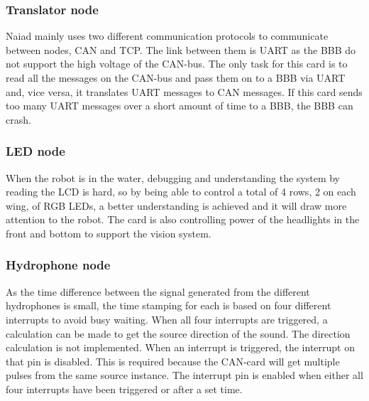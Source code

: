 \subsubsection{Translator node}
\noindent Naiad mainly uses two different communication protocols to communicate between nodes, CAN and TCP. The link between them is UART as the BBB do not support the high voltage of the CAN-bus. The only task for this card is to read all the messages on the CAN-bus and pass them on to a BBB via UART and, vice versa, it translates UART messages to CAN messages. If this card sends too many UART messages over a short amount of time to a BBB, the BBB can crash.  
\subsubsection{LED node}
\noindent When the robot is in the water, debugging and understanding the system by reading the LCD is hard, so by being able to control a total of 4 rows, 2 on each wing, of RGB LEDs, a better understanding is achieved and it will draw more attention to the robot.
The card is also controlling power of the headlights in the front and bottom to support the vision system.
\subsubsection{Hydrophone node}
\noindent As the time difference between the signal generated from the different hydrophones is small, the time stamping for each is based on four different interrupts to avoid busy waiting. When all four interrupts are triggered, a calculation can be made to get the source direction of the sound. The direction calculation is not implemented. When an interrupt is triggered, the interrupt on that pin is disabled. This is required because the CAN-card will get multiple pulses from the same source instance. The interrupt pin is enabled when either all four interrupts have been triggered or after a set time.

